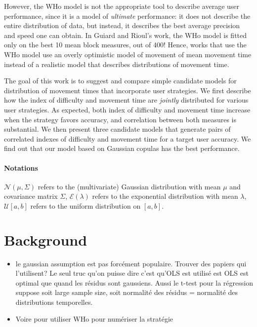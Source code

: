 \documentclass[12pt,a4paper]{article}
\begin{document}
However, the WHo model is not the appropriate tool to describe average user performance, since it is a model of \textit{ultimate} performance: it does not describe the entire distribution of data, but instead, it describes the best average precision and speed one can obtain. In Guiard and Rioul's work, the WHo model is fitted only on the best 10 mean block measures, out of 400! Hence, works that use the WHo model use an overly optimistic model of movement of mean movement time instead of a realistic model that describes distributions of movement time.


The goal of this work is to suggest and compare simple candidate models for distribution of movement times that incorporate user strategies. We first describe how the index of difficulty and movement time are \textit{jointly} distributed for various user strategies. As expected, both index of difficulty and movement time increase when the strategy favors accuracy, and correlation between both measures is substantial. We then present three candidate models that generate pairs of correlated indexes of difficulty and movement time for a target user accuracy. We find out that our model based on Gaussian copulas has the best performance.


\paragraph{Notations} $\mathcal{N}(\mu, \Sigma)$ refers to the (multivariate) Gaussian distribution with mean $\mu$ and covariance matrix $\Sigma$, $\mathcal{E}(\lambda)$ refers to the exponential distribution with mean $\lambda$, $\mathcal{U}[a,b]$ refers to the uniform distribution on $[a,b]$.

\section{Background}

\begin{itemize}
	\item le gaussian assumption est pas forcément populaire. Trouver des papiers qui l'utilisent? Le seul truc qu'on puisse dire c'est qu'OLS est utilisé est OLS est optimal que quand les résidus sont gaussiens. Aussi le t-test pour la régression suppose soit large sample size, soit normalité des résidus = normalité des distributions temporelles.
	\item Voire pour utiliser WHo pour numériser la stratégie
\end{itemize}
\end{document}

